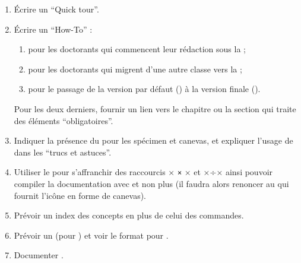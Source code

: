 \begin{enumerate}
\item Écrire un \foreignquote{english}{Quick tour}.
\item Écrire un \foreignquote{english}{How-To} :
  \begin{enumerate}
  \item pour les doctorants qui commencent leur rédaction sous la \yatcl{} ;
  \item pour les doctorants qui migrent d'une autre classe vers la \yatcl{} ;
  \item pour le passage de la version par défaut () à la
    version finale ().
  \end{enumerate}
  Pour les deux derniers, fournir un lien vers le chapitre ou la section qui
  traite des éléments \enquote{obligatoires}.
\item Indiquer la présence du  pour les spécimen et canevas, et
  expliquer l'usage de  dans les \enquote{trucs et astuces}.
\item Utiliser le  pour s'affranchir des raccourcis
  \lstDeleteShortInline×%
  \lstinline|×|
  \lstMakeShortInline[style=dbtex]×%
  et ×÷× ainsi pouvoir compiler la documentation avec  et non
  plus  (il faudra alors renoncer au 
  qui fournit l'icône en forme de canevas).
\item Prévoir un index des concepts en plus de celui des commandes.
\item Prévoir un  (pour ) et voir le format
  pour .
\item Documenter .
\end{enumerate}

%
\iffalse
\fi
